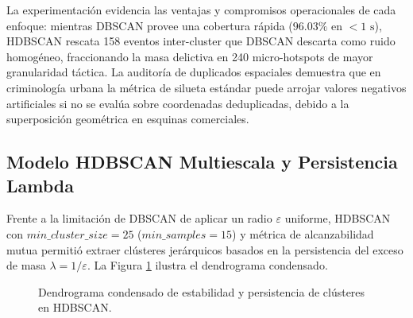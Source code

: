 \begin{interpretacionbox}
La experimentación evidencia las ventajas y compromisos operacionales de cada enfoque: mientras DBSCAN provee una cobertura rápida ($96.03\%$ en $<1\text{ s}$), HDBSCAN rescata 158 eventos inter-cluster que DBSCAN descarta como ruido homogéneo, fraccionando la masa delictiva en 240 micro-hotspots de mayor granularidad táctica. La auditoría de duplicados espaciales demuestra que en criminología urbana la métrica de silueta estándar puede arrojar valores negativos artificiales si no se evalúa sobre coordenadas deduplicadas, debido a la superposición geométrica en esquinas comerciales.
\end{interpretacionbox}

\subsection{Modelo HDBSCAN Multiescala y Persistencia Lambda}

Frente a la limitación de DBSCAN de aplicar un radio $\varepsilon$ uniforme, HDBSCAN con $min\_cluster\_size = 25$ ($min\_samples = 15$) y métrica de alcanzabilidad mutua permitió extraer clústeres jerárquicos basados en la persistencia del exceso de masa $\lambda = 1/\varepsilon$. La Figura \ref{fig:hdbscan_persistencia} ilustra el dendrograma condensado.

\begin{figure}[htbp]
\centering
{}
\caption{Dendrograma condensado de estabilidad y persistencia de clústeres en HDBSCAN.}
\label{fig:hdbscan_persistencia}
\end{figure}

